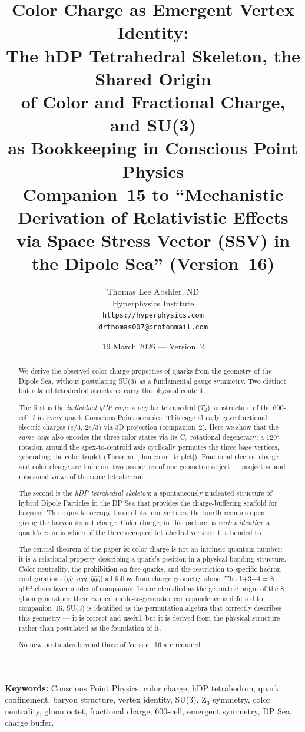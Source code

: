 \documentclass[12pt]{article}
\title{\textbf{Color Charge as Emergent Vertex Identity:\\
The hDP Tetrahedral Skeleton, the Shared Origin\\
of Color and Fractional Charge, and SU(3)\\
as Bookkeeping in Conscious Point Physics}\\[6pt]
{\large Companion~15 to ``Mechanistic Derivation of Relativistic Effects\\
via Space Stress Vector (SSV) in the Dipole Sea'' (Version~16)}}
\author{Thomas Lee Abshier, ND\\
Hyperphysics Institute\\
\texttt{https://hyperphysics.com}\\
\texttt{drthomas007@protonmail.com}}
\date{19 March 2026 --- Version~2}
\begin{document}
\maketitle

\noindent\textbf{Keywords:} Conscious Point Physics, color charge,
hDP tetrahedron, quark confinement, baryon structure, vertex identity,
SU(3), Z$_3$ symmetry, color neutrality, gluon octet, fractional
charge, 600-cell, emergent symmetry, DP Sea, charge buffer.

\begin{abstract}
We derive the observed color charge properties of quarks from the
geometry of the Dipole Sea, without postulating SU(3) as a fundamental
gauge symmetry.  Two distinct but related tetrahedral structures carry
the physical content.

The first is the \emph{individual qCP cage}: a regular tetrahedral
($T_d$) substructure of the 600-cell that every quark Conscious Point
occupies.  This cage already gave fractional electric charges
($e/3$, $2e/3$) via 3D projection (companion~2).  Here we show that
the \emph{same cage} also encodes the three color states via its C$_3$
rotational degeneracy: a 120$^\circ$ rotation around the
apex-to-centroid axis cyclically permutes the three base vertices,
generating the color triplet (Theorem~\ref{thm:color_triplet}).
Fractional electric charge and color charge are therefore two
properties of one geometric object — projective and rotational views
of the same tetrahedron.

The second is the \emph{hDP tetrahedral skeleton}: a spontaneously
nucleated structure of hybrid Dipole Particles in the DP Sea that
provides the charge-buffering scaffold for baryons.  Three quarks
occupy three of its four vertices; the fourth remains open, giving
the baryon its net charge.  Color charge, in this picture, is
\emph{vertex identity}: a quark's color is which of the three
occupied tetrahedral vertices it is bonded to.

The central theorem of the paper is: color charge is not an intrinsic
quantum number; it is a relational property describing a quark's
position in a physical bonding structure.  Color neutrality, the
prohibition on free quarks, and the restriction to specific hadron
configurations ($q\bar{q}$, $qqq$, $\bar{q}\bar{q}\bar{q}$) all
follow from charge geometry alone.  The 1+3+4 = 8 qDP chain layer
modes of companion~14 are identified as the geometric origin of the
8 gluon generators; their explicit mode-to-generator correspondence
is deferred to companion~16.  SU(3) is identified as the permutation
algebra that correctly describes this geometry --- it is correct and
useful, but it is derived from the physical structure rather than
postulated as the foundation of it.

No new postulates beyond those of Version~16 are required.
\end{abstract}
\end{document}
